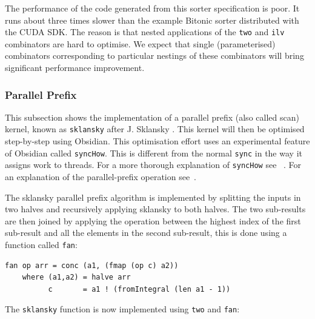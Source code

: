 The performance of the code generated from this sorter specification is poor. It
runs about three times slower than the example Bitonic
sorter distributed with the CUDA SDK. 
The reason is that nested applications of the {\tt two} and {\tt ilv} 
combinators are hard to optimise. We expect that single (parameterised) combinators corresponding
to particular nestings of these combinators will bring significant performance improvement.
%


\subsubsection{Parallel Prefix}
\FloatBarrier

This subsection shows the implementation of a parallel prefix (also called scan) 
kernel, known as {\tt sklansky} after J. Sklansky .
This kernel will then be optimised step-by-step using Obsidian. This 
optimisation effort uses an experimental feature of Obsidian called {\tt syncHow}. 
This is different from the normal {\tt sync} in the way it assigns work to threads. 
For a more thorough explanation of {\tt syncHow} see ~.
For an explanation of the parallel-prefix operation see~. 

The sklansky parallel prefix algorithm 
is implemented by splitting the inputs in two halves and recursively 
applying sklansky to both halves. The two sub-results are then 
joined by applying the operation between the highest index of the first
sub-result and all the elements in the second sub-result, this is done 
using a function called {\tt fan}: 

\begin{small}
\begin{verbatim}
fan op arr = conc (a1, (fmap (op c) a2)) 
    where (a1,a2) = halve arr
          c       = a1 ! (fromIntegral (len a1 - 1))
\end{verbatim}
\end{small}
\noindent
The {\tt sklansky} function is now implemented using 
{\tt two} and {\tt fan}: 

